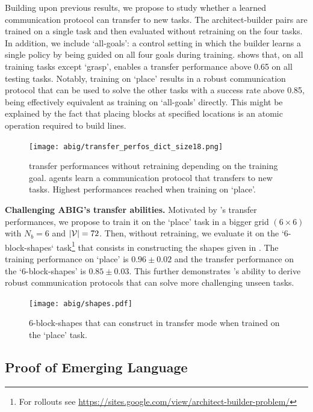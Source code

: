 Building upon previous results, we propose to study whether a learned communication protocol can transfer to new tasks. The architect-builder pairs are trained on a single task and then evaluated without retraining on the four tasks. In addition, we include `all-goals': a control setting in which the builder learns a single policy by being guided on all four goals during training.  shows that, on all training tasks except `grasp', \abig enables a transfer performance above 0.65 on all testing tasks. Notably, training on `place' results in a robust communication protocol that can be used to solve the other tasks with a success rate above 0.85, being effectively equivalent as training on `all-goals' directly. This might be explained by the fact that placing blocks at specified locations is an atomic operation required to build lines.
%
\begin{figure}[!h]
    \centering
    \vspace{-.2cm}
    \texttt{[image: abig/transfer\_perfos\_dict\_size18.png]}
    \vspace{-.3cm}
    \caption{\abim transfer performances without retraining depending on the training goal. \abim agents learn a communication protocol that transfers to new tasks. Highest performances reached when training on `place'.}
    \label{fig:tranfert_performance} 
\end{figure}
%

\noindent\textbf{Challenging ABIG's transfer abilities. } Motivated by \abig's transfer performances, we propose to train it on the `place' task in a bigger grid $(6\times6)$ with $N_b=6$ and $|{\mathcal{V}}|=72$. Then, without retraining, we evaluate it on the `6-block-shapes` task\footnote{For rollouts see \small{\url{ https://sites.google.com/view/architect-builder-problem/}}} that consists in constructing the shapes given in . The training performance on `place' is $0.96 \pm 0.02$ and the transfer performance on the `6-block-shapes' is $0.85\pm0.03$. This further demonstrates \abig's ability to derive robust communication protocols that can solve more challenging unseen tasks.   
\begin{figure}[!h]
    \centering
    \texttt{[image: abig/shapes.pdf]}
    \caption{6-block-shapes that \abim can construct in transfer mode when trained on the `place' task.}
    \label{fig:more_shapes}
\end{figure}


\subsection{Proof of Emerging Language}

